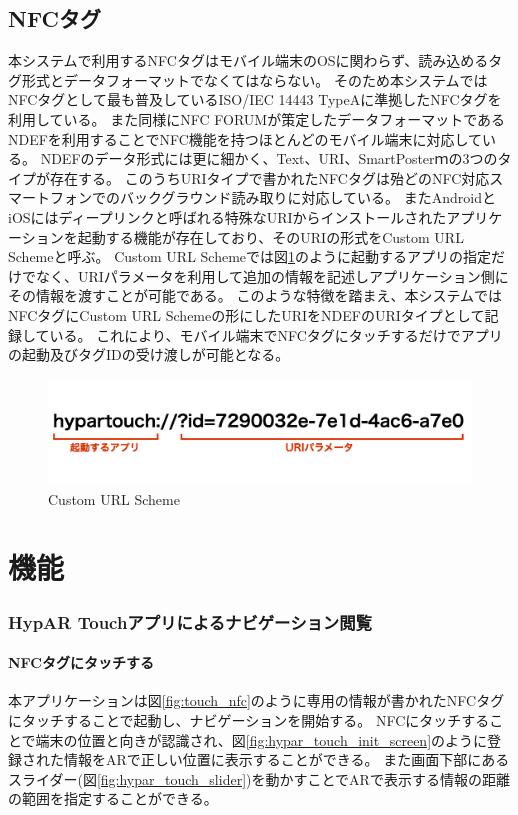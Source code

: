 \subsection{NFCタグ}
本システムで利用するNFCタグはモバイル端末のOSに関わらず、読み込めるタグ形式とデータフォーマットでなくてはならない。
そのため本システムではNFCタグとして最も普及しているISO/IEC 14443 TypeAに準拠したNFCタグを利用している。
また同様にNFC FORUMが策定したデータフォーマットであるNDEFを利用することでNFC機能を持つほとんどのモバイル端末に対応している。
NDEFのデータ形式には更に細かく、Text、URI、SmartPosterｍの3つのタイプが存在する。
このうちURIタイプで書かれたNFCタグは殆どのNFC対応スマートフォンでのバックグラウンド読み取りに対応している。
またAndroidとiOSにはディープリンクと呼ばれる特殊なURIからインストールされたアプリケーションを起動する機能が存在しており、そのURIの形式をCustom URL Schemeと呼ぶ。
Custom URL Schemeでは図\ref{fig:custom_url_scheme}のように起動するアプリの指定だけでなく、URIパラメータを利用して追加の情報を記述しアプリケーション側にその情報を渡すことが可能である。
このような特徴を踏まえ、本システムではNFCタグにCustom URL Schemeの形にしたURIをNDEFのURIタイプとして記録している。
これにより、モバイル端末でNFCタグにタッチするだけでアプリの起動及びタグIDの受け渡しが可能となる。

\begin{figure}[H]
  \centering
  \includegraphics[width=150mm]{images/custom_url_scheme.jpg}
  \caption{Custom URL Scheme} \label{fig:custom_url_scheme}
\end{figure}




\section{機能}

\subsubsection{HypAR Touchアプリによるナビゲーション閲覧}
\paragraph*{NFCタグにタッチする}
本アプリケーションは図\ref{fig:touch_nfc}のように専用の情報が書かれたNFCタグにタッチすることで起動し、ナビゲーションを開始する。
NFCにタッチすることで端末の位置と向きが認識され、図\ref{fig:hypar_touch_init_screen}のように登録された情報をARで正しい位置に表示することができる。
また画面下部にあるスライダー(図\ref{fig:hypar_touch_slider})を動かすことでARで表示する情報の距離の範囲を指定することができる。

